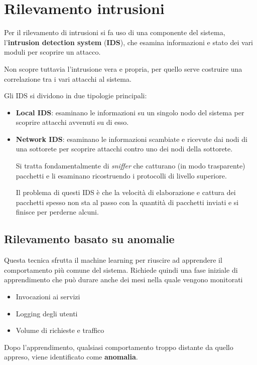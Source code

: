 \chapter{Rilevamento intrusioni}
Per il rilevamento di intrusioni si fa uso di una componente del sistema, l'\textbf{intrusion detection system}
(\textbf{IDS}), che esamina informazioni e stato dei vari moduli per scoprire un attacco.

Non scopre tuttavia l'intrusione vera e propria, per quello serve costruire una correlazione tra i vari attacchi al
sistema.

Gli IDS si dividono in due tipologie principali:
\begin{itemize}
	\item \textbf{Local IDS}: esaminano le informazioni su un singolo nodo del sistema per scoprire attacchi avvenuti
	      su di esso.
	\item \textbf{Network IDS}: esaminano le informazioni scambiate e ricevute dai nodi di una sottorete per scoprire
	      attacchi contro uno dei nodi della sottorete.

	      Si tratta fondamentalmente di \emph{sniffer} che catturano (in modo trasparente) pacchetti e li esaminano
	      ricostruendo i protocolli di livello superiore.

	      Il problema di questi IDS è che la velocità di elaborazione e cattura dei pacchetti spesso non sta al passo
	      con la quantità di pacchetti inviati e si finisce per perderne alcuni.
\end{itemize}

\section{Rilevamento basato su anomalie}
Questa tecnica sfrutta il machine learning per riuscire ad apprendere il comportamento più comune del sistema. Richiede
quindi una fase iniziale di apprendimento che può durare anche dei mesi nella quale vengono monitorati
\begin{itemize}
	\item Invocazioni ai servizi
	\item Logging degli utenti
	\item Volume di richieste e traffico
\end{itemize}
Dopo l'apprendimento, qualsiasi comportamento troppo distante da quello appreso, viene identificato come
\textbf{anomalia}.


